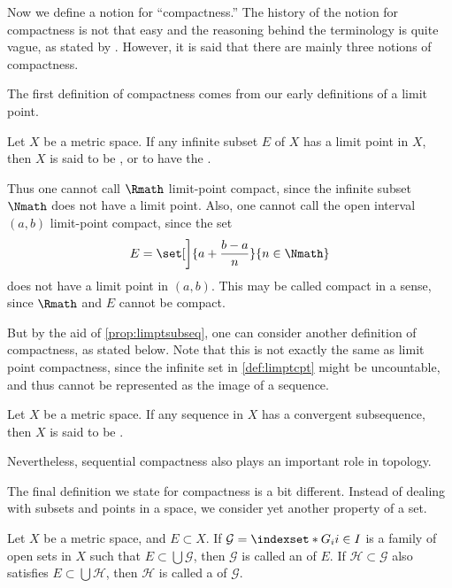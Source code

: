 \label{sec:mcptcnt}

Now we define a notion for ``compactness.''
The history of the notion for compactness is not that easy
and the reasoning behind the terminology is quite vague,
as stated by \textcite{cpt-hist}.
However, it is said that
there are mainly three notions of compactness.

The first definition of compactness
comes from our early definitions of a limit point.

\begin{definition}
    \label{def:limptcpt}
    Let \(X\) be a metric space.
    If any infinite subset \(E\) of \(X\) has a limit point in \(X\),
    then \(X\) is said
    to be ,
    or to have the .
\end{definition}

Thus one cannot call \(\Rmath\) limit-point compact,
since the infinite subset \(\Nmath\) does not have a limit point.
Also, one cannot call the open interval \((a,b)\) limit-point compact,
since the set
\[
    E
    =\set[\bigg]{a+\frac{b-a}{n}}{n\in\Nmath}
\]
does not have a limit point in \((a,b)\).
This may be called compact in a sense,
since \(\Rmath\) and \(E\) cannot be compact.

But by the aid of \cref{prop:limptsubseq},
one can consider another definition of compactness,
as stated below.
Note that
this is not exactly the same as limit point compactness,
since the infinite set in \cref{def:limptcpt} might be uncountable,
and thus cannot be represented as the image of a sequence.

\begin{definition}
    \label{def:seqcpt}
    Let \(X\) be a metric space.
    If any sequence in \(X\) has a convergent subsequence,
    then \(X\) is said
    to be .
\end{definition}

Nevertheless,
sequential compactness also plays an important role in topology.

The final definition we state for compactness is a bit different.
Instead of dealing with subsets and points in a space,
we consider yet another property of a set.

\begin{definition}
    \label{def:opencover}
    Let \(X\) be a metric space,
    and \(E\subset X\).
    If \(\mathcal G=\indexset*{G_i}{i\in I}{}\) is a family of
    open sets in \(X\) such that
    \(E\subset\bigcup\mathcal G\),
    then \(\mathcal G\) is called
    an  of \(E\).
    If \(\mathcal H\subset\mathcal G\) also satisfies
    \(E\subset\bigcup\mathcal H\),
    then \(\mathcal H\) is called
    a  of \(\mathcal G\).
\end{definition}

